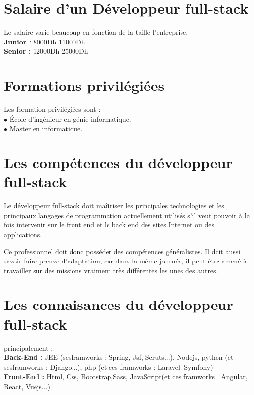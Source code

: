 \documentclass[a4paper, 12pt,french,oneside]{book}%
\theoremstyle{definition}
\theoremstyle{remark}
\begin{document}
\section{Salaire d’un Développeur full-stack} 
Le salaire varie beaucoup en fonction de la taille l’entreprise.\\
\textbf{Junior :} 8000Dh-11000Dh\\
\textbf{Senior :} 12000Dh-25000Dh
\section{Formations privilégiées}
Les formation privilégiées sont :\\
$\bullet$ École d’ingénieur en génie informatique.\\
$\bullet$ Master en informatique.
\section{Les compétences du développeur full-stack}
Le développeur full-stack doit maîtriser les principales technologies et les principaux langages de programmation actuellement utilisés s’il veut pouvoir à la fois intervenir sur le front end et le back end des sites Internet ou des applications. 

Ce professionnel doit donc posséder des compétences généralistes. Il doit aussi savoir faire preuve d’adaptation, car dans la même journée, il peut être amené à travailler sur des missions vraiment très différentes les unes des autres.
\section{Les connaisances du développeur full-stack}
principalement :\\
\textbf{Back-End :} JEE (sesframworks : Spring, Jsf, Scruts...), Nodejs, python (et sesframworks : Django...), php (et ces framworks : Laravel, Symfony)\\
\textbf{Front-End : }Html, Css, Bootstrap,Sass, JavaScript(et
ces framworks : Angular, React, Vuejs...)
\end{document}
